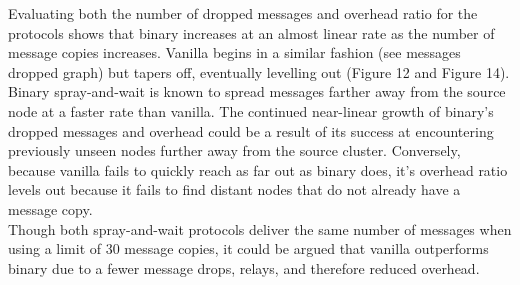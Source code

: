 \documentclass{article}
\begin{document}
\newline Evaluating both the number of dropped messages and overhead ratio for the protocols shows that binary increases at an almost linear rate as the number of message copies increases. Vanilla begins in a similar fashion (see messages dropped graph) but tapers off, eventually levelling out (Figure 12 and Figure 14). Binary spray-and-wait is known to spread messages farther away from the source node at a faster rate than vanilla. The continued near-linear growth of binary's dropped messages and overhead could be a result of its success at encountering previously unseen nodes further away from the source cluster. Conversely, because vanilla fails to quickly reach as far out as binary does, it's overhead ratio levels out because it fails to find distant nodes that do not already have a message copy.\\
\newline Though both spray-and-wait protocols deliver the same number of messages when using a limit of 30 message copies, it could be argued that vanilla outperforms binary due to a fewer message drops, relays, and therefore reduced overhead.

\end{document}
